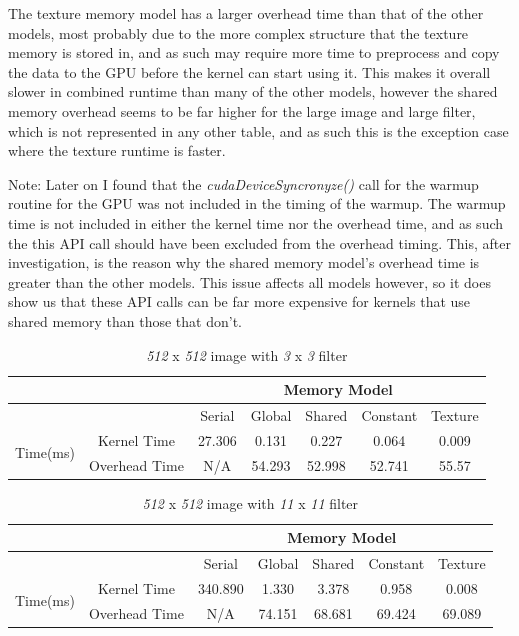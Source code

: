 \documentclass[a4paper,twoside,11pt]{report}
\begin{document}
The texture memory model has a larger overhead time than that of the other models, most probably due to the more complex structure that the texture memory is stored in, and as such may require more time to preprocess and copy the data to the GPU before the kernel can start using it. This makes it overall slower in combined runtime than many of the other models, however the shared memory overhead seems to be far higher for the large image and large filter, which is not represented in any other table, and as such this is the exception case where the texture runtime is faster.

Note: Later on I found that the \textit{cudaDeviceSyncronyze()} call for the warmup routine for the GPU was not included in the timing of the warmup. The warmup time is not included in either the kernel time nor the overhead time, and as such the this API call should have been excluded from the overhead timing. This, after investigation, is the reason why the shared memory model's overhead time is greater than the other models. This issue affects all models however, so it does show us that these API calls can be far more expensive for kernels that use shared memory than those that don't.


\begin{table}[H]
	\centering
	\caption{\textit{512} x \textit{512} image with \textit{3} x \textit{3} filter}
	\label{lena3}
	\begin{tabular}{|c|c|c|c|c|c|c|}
		\hline
		&               & \multicolumn{5}{c|}{Memory Model}             \\ \hline
		&               & Serial & Global & Shared & Constant & Texture \\ \hline
		\multirow{2}{*}{Time(ms)} & Kernel Time   & 27.306 & 0.131  & 0.227  & 0.064    & 0.009   \\ \cline{2-7} 
		& Overhead Time & N/A    & 54.293 & 52.998 & 52.741   & 55.57   \\ \hline
	\end{tabular}
\end{table}

\begin{table}[H]
	\centering
	\caption{\textit{512} x \textit{512} image with \textit{11} x \textit{11} filter}
	\label{lena11}
	\begin{tabular}{|c|c|c|c|c|c|c|}
		\hline
		&               & \multicolumn{5}{c|}{Memory Model}             \\ \hline
		&               & Serial & Global & Shared & Constant & Texture \\ \hline
		\multirow{2}{*}{Time(ms)} & Kernel Time   & 340.890 & 1.330  & 3.378  & 0.958    & 0.008   \\ \cline{2-7} 
		& Overhead Time & N/A    & 74.151 & 68.681 & 69.424   & 69.089   \\ \hline
	\end{tabular}
\end{table}
\end{document}
